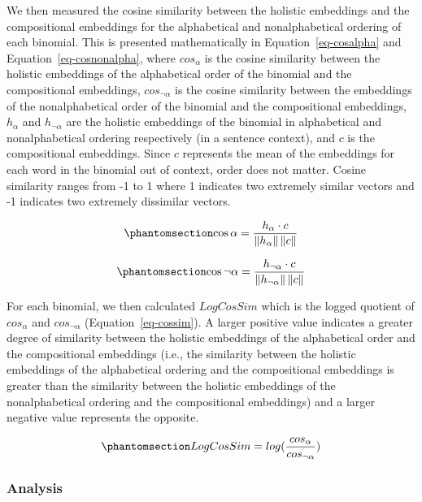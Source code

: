 \documentclass[
  12pt,
  letterpaper,
]{scrreport}
\begin{document}
We then measured the cosine similarity between the holistic embeddings
and the compositional embeddings for the alphabetical and
nonalphabetical ordering of each binomial. This is presented
mathematically in Equation~\ref{eq-cosalpha} and
Equation~\ref{eq-cosnonalpha}, where \(cos_\alpha\) is the cosine
similarity between the holistic embeddings of the alphabetical order of
the binomial and the compositional embeddings, \(cos_{\neg\alpha}\) is
the cosine similarity between the embeddings of the nonalphabetical
order of the binomial and the compositional embeddings, \(h_\alpha\) and
\(h_{\neg\alpha}\) are the holistic embeddings of the binomial in
alphabetical and nonalphabetical ordering respectively (in a sentence
context), and \(c\) is the compositional embeddings. Since \(c\)
represents the mean of the embeddings for each word in the binomial out
of context, order does not matter. Cosine similarity ranges from -1 to 1
where 1 indicates two extremely similar vectors and -1 indicates two
extremely dissimilar vectors.

\begin{equation}\phantomsection\label{eq-cosalpha}{
\cos \alpha = \frac{h_\alpha \cdot c}{\left\lVert h_\alpha \right\rVert \left\lVert c \right\rVert}
}\end{equation}

\begin{equation}\phantomsection\label{eq-cosnonalpha}{
\cos \neg\alpha = \frac{h_{\neg\alpha} \cdot c}{\left\lVert h_{\neg\alpha}\right\rVert \left\lVert c \right\rVert}
}\end{equation}

For each binomial, we then calculated \(LogCosSim\) which is the logged
quotient of \(cos_\alpha\) and \(cos_{\neg\alpha}\)
(Equation~\ref{eq-cossim}). A larger positive value indicates a greater
degree of similarity between the holistic embeddings of the alphabetical
order and the compositional embeddings (i.e., the similarity between the
holistic embeddings of the alphabetical ordering and the compositional
embeddings is greater than the similarity between the holistic
embeddings of the nonalphabetical ordering and the compositional
embeddings) and a larger negative value represents the opposite.

\begin{equation}\phantomsection\label{eq-cossim}{
LogCosSim = log(\frac{cos_\alpha}{cos_{\neg\alpha}})
}\end{equation}

\subsubsection{Analysis}\label{analysis-4}
\end{document}
